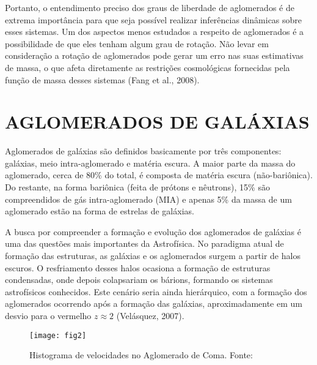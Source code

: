 \documentclass[12pt,fleqn]{article}
\begin{document}
{Portanto, o entendimento preciso dos graus de liberdade de aglomerados é de extrema
importância para que seja possível realizar inferências dinâmicas sobre esses sistemas. Um
dos aspectos menos estudados a respeito de aglomerados é a possibilidade de que eles tenham
algum grau de rotação. Não levar em consideração a rotação de aglomerados pode gerar um
erro nas suas estimativas de massa, o que afeta diretamente as restrições cosmológicas
fornecidas pela função de massa desses sistemas (Fang et al., 2008).


\section{AGLOMERADOS DE GALÁXIAS}
Aglomerados de galáxias são definidos basicamente por três componentes: galáxias,
meio intra-aglomerado e matéria escura. A maior parte da massa do aglomerado, cerca de
80\% do total, é composta de matéria escura (não-bariônica). Do restante, na forma bariônica
(feita de prótons e nêutrons), 15\% são compreendidos de gás intra-aglomerado (MIA) e apenas
5\% da massa de um aglomerado estão na forma de estrelas de galáxias.

A busca por compreender a formação e evolução dos aglomerados de galáxias é uma
das questões mais importantes da Astrofísica. No paradigma atual de formação das estruturas,
as galáxias e os aglomerados surgem a partir de halos escuros. O resfriamento desses halos
ocasiona a formação de estruturas condensadas, onde depois colapsariam os bárions, formando 
os sistemas astrofísicos conhecidos. Este cenário seria ainda hierárquico, com a formação dos 
aglomerados ocorrendo após a formação das
galáxias, aproximadamente em um desvio para o vermelho $z \approx 2$ 
(Velásquez, 2007).


\begin{figure}[!htbp] %
\vspace{-2pt}
\begin{center}
\texttt{[image: fig2]}%
\caption{Histograma de velocidades no Aglomerado de Coma. Fonte:}
\label{fig1}%
\end{center}
\end{figure}


}
\end{document}
